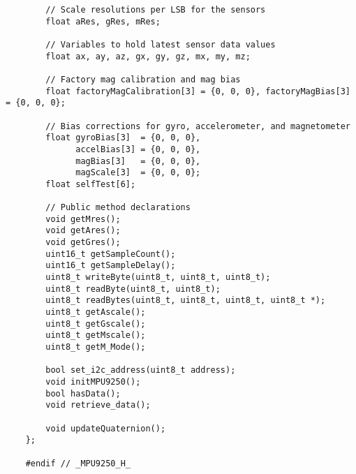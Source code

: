 \begin{lstlisting}
	    // Scale resolutions per LSB for the sensors
	    float aRes, gRes, mRes;

	    // Variables to hold latest sensor data values
	    float ax, ay, az, gx, gy, gz, mx, my, mz;

	    // Factory mag calibration and mag bias
	    float factoryMagCalibration[3] = {0, 0, 0}, factoryMagBias[3] = {0, 0, 0};

	    // Bias corrections for gyro, accelerometer, and magnetometer
	    float gyroBias[3]  = {0, 0, 0},
	          accelBias[3] = {0, 0, 0},
	          magBias[3]   = {0, 0, 0},
	          magScale[3]  = {0, 0, 0};
	    float selfTest[6];

	    // Public method declarations
	    void getMres();
	    void getAres();
	    void getGres();
	    uint16_t getSampleCount();
	    uint16_t getSampleDelay();
	    uint8_t writeByte(uint8_t, uint8_t, uint8_t);
	    uint8_t readByte(uint8_t, uint8_t);
	    uint8_t readBytes(uint8_t, uint8_t, uint8_t, uint8_t *);
	    uint8_t getAscale();
	    uint8_t getGscale();
	    uint8_t getMscale();
	    uint8_t getM_Mode();

	    bool set_i2c_address(uint8_t address);
	    void initMPU9250();
	    bool hasData();
	    void retrieve_data();
	    
	    void updateQuaternion();
	};

	#endif // _MPU9250_H_
	\end{lstlisting}

